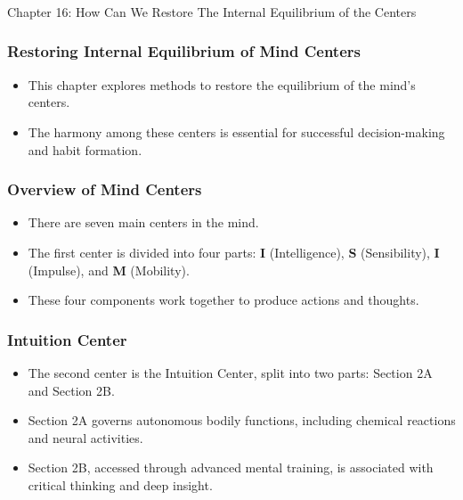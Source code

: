 \begin{frame}[fragile]\frametitle{}
\begin{center}
{\Large Chapter 16: How Can We Restore The Internal Equilibrium of the Centers  }
\end{center}
\end{frame}

\begin{frame}[fragile]\frametitle{Restoring Internal Equilibrium of Mind Centers}
    \begin{itemize}
        \item This chapter explores methods to restore the equilibrium of the mind’s centers.
        \item The harmony among these centers is essential for successful decision-making and habit formation.
    \end{itemize}
\end{frame}

\begin{frame}[fragile]\frametitle{Overview of Mind Centers}
    \begin{itemize}
        \item There are seven main centers in the mind.
        \item The first center is divided into four parts: \textbf{I} (Intelligence), \textbf{S} (Sensibility), \textbf{I} (Impulse), and \textbf{M} (Mobility).
        \item These four components work together to produce actions and thoughts.
    \end{itemize}
\end{frame}

\begin{frame}[fragile]\frametitle{Intuition Center}
    \begin{itemize}
        \item The second center is the Intuition Center, split into two parts: Section 2A and Section 2B.
        \item Section 2A governs autonomous bodily functions, including chemical reactions and neural activities.
        \item Section 2B, accessed through advanced mental training, is associated with critical thinking and deep insight.
    \end{itemize}
\end{frame}

